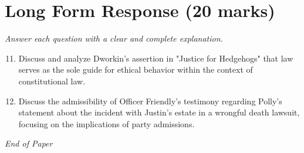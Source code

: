 \documentclass[12pt]{article}
\begin{document}
\section*{Long Form Response (20 marks)}
\textit{Answer each question with a clear and complete explanation.}
\begin{enumerate}[label=\arabic*.]
\setcounter{enumi}{10}
\item Discuss and analyze Dworkin's assertion in "Justice for Hedgehogs" that law serves as the sole guide for ethical behavior within the context of constitutional law.
\item Discuss the admissibility of Officer Friendly's testimony regarding Polly's statement about the incident with Justin's estate in a wrongful death lawsuit, focusing on the implications of party admissions.
\end{enumerate}

\vfill
\noindent\textit{End of Paper}
\end{document}
